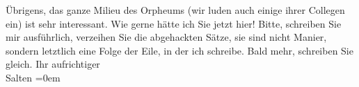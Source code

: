 \begin{ledgroupsized}[t]{13cm}
           \pstart
           Übrigens, das ganze Milieu des Orpheums (wir luden
               auch einige ihrer Collegen ein) ist sehr interessant.\pend
           \pstart
           Wie gerne hätte ich Sie jetzt hier!\pend
           \pstart
           Bitte, schreiben Sie mir ausführlich, verzeihen Sie die abgehackten Sätze, sie sind
               nicht Manier, sondern letztlich eine Folge der Eile, in der ich schreibe.\pend
           \pstart
           Bald mehr, schreiben Sie gleich. Ihr aufrichtiger {\\[\baselineskip]}\spacefill\mbox{Salten}\pend
           \leftskip=0em{}
         
         \endnumbering{}\end{ledgroupsized}  \newcommand{\dateiname}{L03103}\newcommand{\titel}{Felix Salten an Arthur Schnitzler, 2. 9. 1891}\newcommand{\editorInnen}{Martin Anton Müller und Laura Untner}
      
